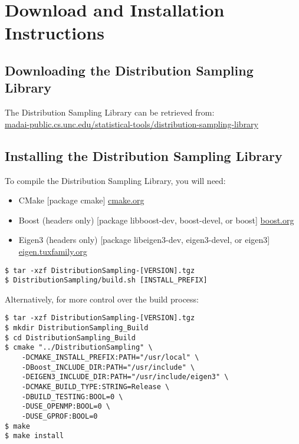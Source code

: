 \section{Download and Installation Instructions}\label{sec:download}

\subsection{Downloading the Distribution Sampling Library}

The Distribution Sampling Library can be retrieved from: \\
\href{https://madai-public.cs.unc.edu/statistical-tools/distribution-sampling-library/}{madai-public.cs.unc.edu/statistical-tools/distribution-sampling-library}

\subsection{Installing the Distribution Sampling Library}

To compile the Distribution Sampling Library, you will need:
\begin{itemize}
\item CMake [package cmake] \href{http://www.cmake.org/cmake/resources/software.html}{cmake.org}
\item Boost (headers only) [package libboost-dev, boost-devel, or boost] \href{http://www.boost.org/users/download/}{boost.org}
\item Eigen3 (headers only) [package libeigen3-dev, eigen3-devel, or eigen3]
\href{http://eigen.tuxfamily.org/}{eigen.tuxfamily.org}
\end{itemize}

\begin{verbatim}
$ tar -xzf DistributionSampling-[VERSION].tgz
$ DistributionSampling/build.sh [INSTALL_PREFIX]
\end{verbatim}

Alternatively, for more control over the build process:

\begin{verbatim}
$ tar -xzf DistributionSampling-[VERSION].tgz
$ mkdir DistributionSampling_Build
$ cd DistributionSampling_Build
$ cmake "../DistributionSampling" \
    -DCMAKE_INSTALL_PREFIX:PATH="/usr/local" \
    -DBoost_INCLUDE_DIR:PATH="/usr/include" \
    -DEIGEN3_INCLUDE_DIR:PATH="/usr/include/eigen3" \
    -DCMAKE_BUILD_TYPE:STRING=Release \
    -DBUILD_TESTING:BOOL=0 \
    -DUSE_OPENMP:BOOL=0 \
    -DUSE_GPROF:BOOL=0
$ make
$ make install
\end{verbatim}



